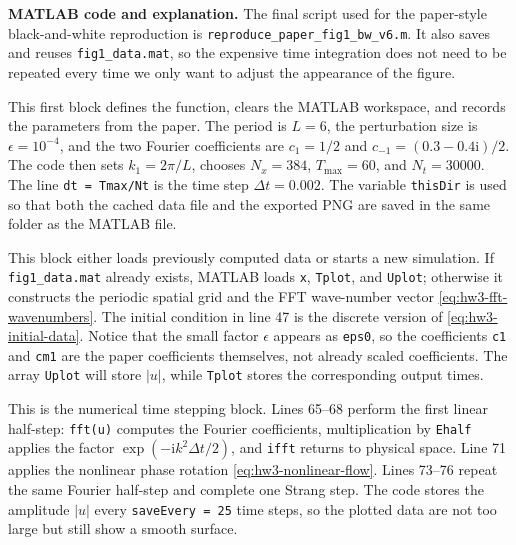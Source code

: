 \documentclass{amsart}
\newcounter{hw}
\newcounter{note}
\numberwithin{equation}{hw}
\newcommand{\noteheading}[1]{\vspace{1em}\noindent\textbf{#1}}
\begin{document}
\noteheading{MATLAB code and explanation.}
The final script used for the paper-style black-and-white reproduction is
\texttt{reproduce\_paper\_fig1\_bw\_v6.m}.  It also saves and reuses
\texttt{fig1\_data.mat}, so the expensive time integration does not need
to be repeated every time we only want to adjust the appearance of the
figure.



This first block defines the function, clears the MATLAB workspace, and
records the parameters from the paper.  The period is \(L=6\), the
perturbation size is \(\epsilon=10^{-4}\), and the two Fourier
coefficients are \(c_1=1/2\) and
\(c_{-1}=(0.3-0.4\mathrm{i})/2\).  The code then sets
\(k_1=2\pi/L\), chooses \(N_x=384\), \(T_{\max}=60\), and
\(N_t=30000\).  The line \texttt{dt = Tmax/Nt} is the time step
\(\Delta t=0.002\).  The variable \texttt{thisDir} is used so that both
the cached data file and the exported PNG are saved in the same folder as
the MATLAB file.



This block either loads previously computed data or starts a new
simulation.  If \texttt{fig1\_data.mat} already exists, MATLAB loads
\texttt{x}, \texttt{Tplot}, and \texttt{Uplot}; otherwise it constructs
the periodic spatial grid and the FFT wave-number vector
\eqref{eq:hw3-fft-wavenumbers}.  The initial condition in line 47 is the
discrete version of \eqref{eq:hw3-initial-data}.  Notice that the small
factor \(\epsilon\) appears as \texttt{eps0}, so the coefficients
\texttt{c1} and \texttt{cm1} are the paper coefficients themselves, not
already scaled coefficients.  The array \texttt{Uplot} will store
\(|u|\), while \texttt{Tplot} stores the corresponding output times.



This is the numerical time stepping block.  Lines 65--68 perform the
first linear half-step: \texttt{fft(u)} computes the Fourier
coefficients, multiplication by \texttt{Ehalf} applies the factor
\(\exp(-\mathrm{i}k^2\Delta t/2)\), and \texttt{ifft} returns to
physical space.  Line 71 applies the nonlinear phase rotation
\eqref{eq:hw3-nonlinear-flow}.  Lines 73--76 repeat the same Fourier
half-step and complete one Strang step.  The code stores the amplitude
\(|u|\) every \texttt{saveEvery = 25} time steps, so the plotted data are
not too large but still show a smooth surface.
\end{document}
